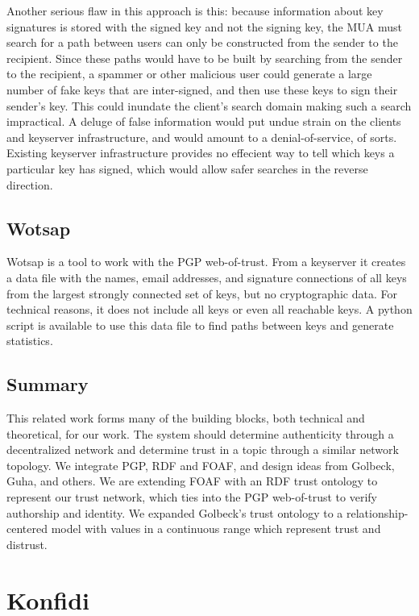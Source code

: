 \documentclass[letterpaper]{www2006-submission}
\begin{document}
Another serious flaw in this approach is this:  because information about key signatures is stored with the signed key and not the signing key, the MUA must search for a path between users can only be constructed from the sender to the recipient.  Since these paths would have to be built by searching from the sender to the recipient, a spammer or other malicious user could generate a large number of fake keys that are inter-signed, and then use these keys to sign their sender's key.  This could inundate the client's search domain making such a search impractical.  A deluge of false information would put undue strain on the clients and keyserver infrastructure, and would amount to a denial-of-service, of sorts.  Existing keyserver infrastructure provides no effecient way to tell which keys a particular key has signed, which would allow safer searches in the reverse direction.

\subsection{Wotsap}
\label{wotsap}
Wotsap \citep{wotsap} is a tool to work with the PGP web-of-trust.  From a keyserver it creates a data file with the names, email addresses, and signature connections of all keys from the largest strongly connected set of keys, but no cryptographic data.  For technical reasons, it does not include all keys or even all reachable keys.  A python script is available to use this data file to find paths between keys and generate statistics.

\subsection{Summary}
This related work forms many of the building blocks, both technical and theoretical, for our work.  The system should determine authenticity through a decentralized network and determine trust in a topic through a similar network topology.  We integrate PGP, RDF and FOAF, and design ideas from Golbeck, Guha, and others.  We are extending FOAF with an RDF trust ontology to represent our trust network, which ties into the PGP web-of-trust to verify authorship and identity.  We expanded Golbeck's trust ontology to a relationship-centered model with values in a continuous range which represent trust and distrust.

\section{Konfidi}
\end{document}
